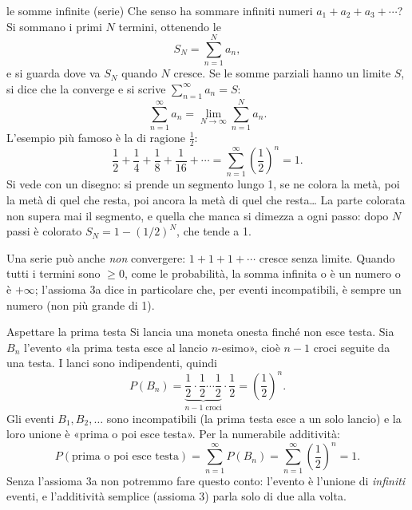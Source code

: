 \begin{richiamo}{le somme infinite (serie)}
Che senso ha sommare infiniti numeri $a_1 + a_2 + a_3 + \cdots$? Si sommano i primi $N$ termini, ottenendo le
\[ S_N = \sum_{n=1}^{N} a_n , \]
e si guarda dove va $S_N$ quando $N$ cresce. Se le somme parziali hanno un limite $S$, si dice che la 
converge e si scrive $\sum_{n=1}^{\infty} a_n = S$:
\[ \sum_{n=1}^{\infty} a_n = \lim_{N \to \infty} \sum_{n=1}^{N} a_n . \]
L'esempio più famoso è la  di ragione $\tfrac12$:
\[ \frac12 + \frac14 + \frac18 + \frac1{16} + \cdots = \sum_{n=1}^{\infty} \left(\frac12\right)^n = 1 . \]
Si vede con un disegno: si prende un segmento lungo 1, se ne colora la metà, poi la metà di quel che resta, poi
ancora la metà di quel che resta\ldots{} La parte colorata non supera mai il segmento, e quella che manca si dimezza
a ogni passo: dopo $N$ passi è colorato $S_N = 1 - (1/2)^N$, che tende a 1.
\begin{center}
\end{center}
Una serie può anche \emph{non} convergere: $1 + 1 + 1 + \cdots$ cresce senza limite. Quando tutti i termini sono
$\geq 0$, come le probabilità, la somma infinita o è un numero o è $+\infty$; l'assioma 3a dice in particolare che,
per eventi incompatibili, è sempre un numero (non più grande di 1).
\end{richiamo}

\begin{esempio}{Aspettare la prima testa}
Si lancia una moneta onesta finché non esce testa. Sia $B_n$ l'evento «la prima testa esce al lancio $n$-esimo»,
cioè $n - 1$ croci seguite da una testa. I lanci sono indipendenti, quindi
\[ P(B_n) = \underbrace{\frac12 \cdot \frac12 \cdots \frac12}_{n-1 \text{ croci}} \cdot \frac12 = \left(\frac12\right)^n . \]
Gli eventi $B_1, B_2, \ldots$ sono incompatibili (la prima testa esce a un solo lancio) e la loro unione è «prima o
poi esce testa». Per la numerabile additività:
\[ P(\text{prima o poi esce testa}) = \sum_{n=1}^{\infty} P(B_n) = \sum_{n=1}^{\infty} \left(\frac12\right)^n = 1 . \]
Senza l'assioma 3a non potremmo fare questo conto: l'evento è l'unione di \emph{infiniti} eventi, e l'additività
semplice (assioma 3) parla solo di due alla volta.
\end{esempio}

